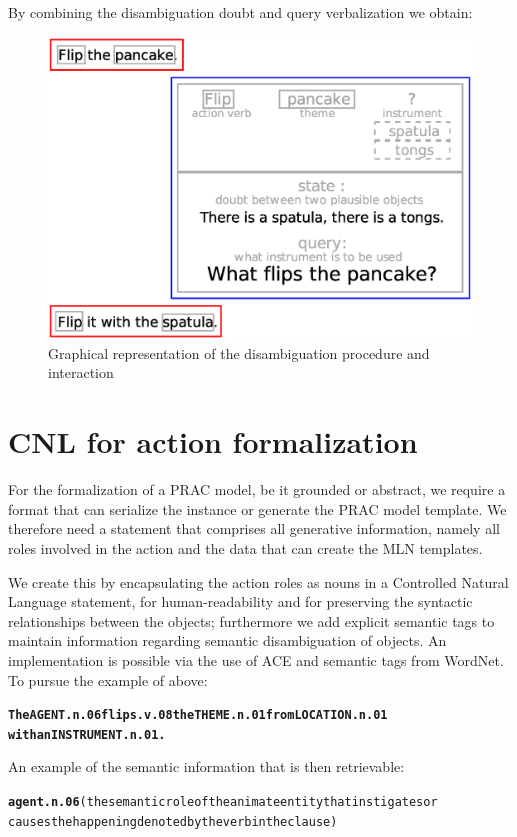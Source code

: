 \documentclass[oribibl]{llncs}
\begin{document}
By combining the disambiguation doubt and query verbalization we obtain:
  \begin{figure}[H]
\includegraphics[scale=0.51, trim= 0mm 0mm 0mm 10mm]{results.eps}
\caption{Graphical representation of the disambiguation procedure and interaction}
\end{figure}
\section{CNL for action formalization}
For the formalization of a PRAC model, be it grounded or abstract, we require a format that can serialize the instance or generate the PRAC model template.
We therefore need a statement that comprises all generative information, namely all roles involved in the action and the data that can create the MLN templates.  

We create this by encapsulating the action roles as nouns in a Controlled Natural Language statement, for human-readability and for preserving the syntactic relationships between the objects; furthermore we add explicit semantic tags to maintain information regarding semantic disambiguation of objects.
An implementation is possible via the use of ACE and semantic tags from WordNet\cite{Miller95wordnet:a}. To pursue the example of above:
\begin{alltt}
\textbf{The AGENT.n.06 flips.v.08 the THEME.n.01 from LOCATION.n.01 \\with an INSTRUMENT.n.01.}
\end{alltt}
An example of the semantic information that is then retrievable:
{\small
\begin{alltt}
\textbf{agent.n.06} {\color{red}(the semantic role of the animate entity that instigates or 
causes the happening denoted by the verb in the clause)}
\end{alltt}}
\end{document}

